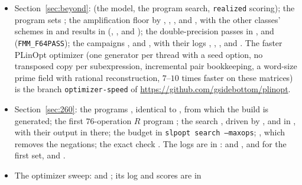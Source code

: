 \documentclass[11pt]{article}
\theoremstyle{remark}
\begin{document}
\begin{itemize}
  its output in ;
   writes Table~\ref{tab:model}.
\item Section~\ref{sec:beyond}:  (the model,
  the program search, \texttt{realized} scoring); the program sets
  ; the amplification
  floor by , ,
  ,  and ,
  with the other classes' schemes in  and
  results in  (,
  ,  and );
  the double-precision passes in
  ,  and 
  (\texttt{FMM\_F64PASS}); the campaigns ,
   and , with their logs
  , , ,
   and .  The
  faster PLinOpt optimizer (one generator per thread with a seed option,
  no transposed copy per subexpression, incremental pair bookkeeping, a
  word-size prime field with rational reconstruction, $7$--$10$ times
  faster on these matrices) is the branch \texttt{optimizer-speed} of
  \url{https://github.com/gsidebottom/plinopt}.
\item Section~\ref{sec:260}: the programs
  , identical to
  , from which the build
   is generated; the first $76$-operation
  $R$ program ; the search
  , driven by , 
  and  in , with their output
  in  there; the budget in \texttt{slpopt
  search --maxops}; , which removes the
  negations; the exact check .  The logs
  are in :  and
  ,  and
   for the first set, and
  .
\item The optimizer sweep:  and
  ; its log and scores are in

\end{itemize}
\end{document}
